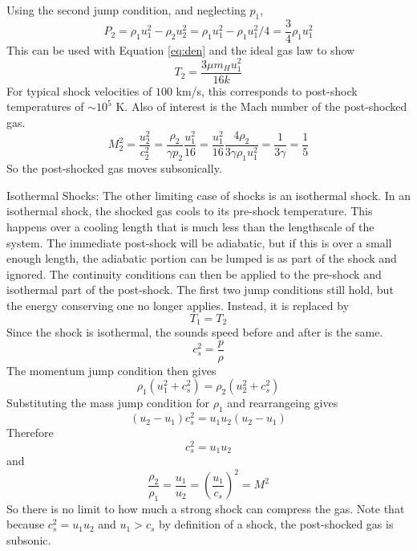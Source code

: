 Using the second jump condition, and neglecting $p_1$, 
\begin{equation}
P_2=\rho_1u_1^2-\rho_2u_2^2=\rho_1u_1^2-\rho_1u_1^2/4=\frac{3}{4}\rho_1u_1^2
\end{equation}
This can be used with Equation \ref{eq:den} and the ideal gas law to show 
\begin{equation}
\boxed{T_2=\frac{3\mu m_H u_1^2}{16k}}
\end{equation}
For typical shock velocities of $100$ km/s, this corresponds to post-shock 
temperatures of $\sim10^5$ K.  Also of interest is the Mach number of the 
post-shocked gas.  
\begin{equation}
M_2^2=\frac{u_2^2}{c_2^2}=
\frac{\rho_2}{\gamma p_2}\frac{u_1^2}{16}=
\frac{u_1^2}{16}\frac{4\rho_2}{3\gamma\rho_1u_1^2}=
\frac{1}{3\gamma}=
\frac{1}{5}
\end{equation}
So the post-shocked gas moves subsonically.

Isothermal Shocks:\newline
The other limiting case of shocks is an isothermal shock.  In an isothermal 
shock, the shocked gas cools to its pre-shock temperature.  This 
happens over a cooling length that is much less than the lengthscale of the 
system.  The immediate post-shock will be adiabatic, but if this is over a 
small enough length, the adiabatic portion can be lumped is as part of the 
shock and ignored.  The continuity conditions can then be applied to the 
pre-shock and isothermal part of the post-shock.  The first two jump conditions 
still hold, but the energy conserving one no longer applies.  Instead, it is 
replaced by 
\begin{equation}
\boxed{T_1=T_2}
\end{equation}
Since the shock is isothermal, the sounds speed before and after is the same.
\begin{equation}
c_s^2=\frac{p}{\rho}
\end{equation}
The momentum jump condition then gives
\begin{equation}
\rho_1(u_1^2+c_s^2)=\rho_2(u_2^2+c_s^2)
\end{equation}
Substituting the mass jump condition for $\rho_1$ and rearrangeing gives
\begin{equation}
(u_2-u_1)c_s^2=u_1u_2(u_2-u_1)
\end{equation}
Therefore
\begin{equation}
c_s^2=u_1u_2
\end{equation}
and 
\begin{equation}
\boxed{\frac{\rho_2}{\rho_1}=\frac{u_1}{u_2}=\left(\frac{u_1}{c_s}\right)^2=M^2}
\end{equation}
So there is no limit to how much a strong shock can compress the gas.  
Note that because $c_s^2=u_1u_2$ and $u_1>c_s$ by definition of a shock, the 
post-shocked gas is subsonic.  

